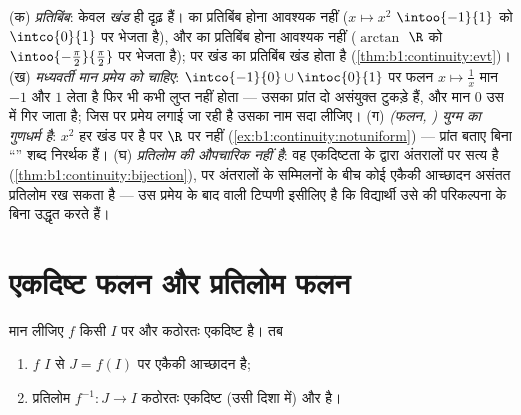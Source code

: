 \begin{remark}[तीनों प्रमेयों के इर्द-गिर्द सामान्य भूलें]
(क) \emph{ प्रतिबिंब}: केवल \emph{खंड} ही दृढ़ हैं।   का 
प्रतिबिंब  होना आवश्यक नहीं ($x \mapsto x^2$ $\intoo{-1}{1}$ को
$\intco{0}{1}$ पर भेजता है), और  का प्रतिबिंब  होना आवश्यक
नहीं ($\arctan$  $\R$ को  $\intoo{-\frac\pi2}{\frac\pi2}$ पर भेजता
है); पर खंड का प्रतिबिंब खंड होता है (\cref{thm:b1:continuity:evt})। (ख)
\emph{मध्यवर्ती मान प्रमेय को  चाहिए}: $\intco{-1}{0} \cup
\intoc{0}{1}$ पर  फलन $x \mapsto \frac1x$ मान $-1$ और $1$ लेता है फिर भी
कभी लुप्त नहीं होता --- उसका प्रांत दो असंयुक्त टुकड़े हैं, और मान $0$ उस
 में गिर जाता है; जिस  पर प्रमेय लगाई जा रही है उसका नाम सदा
लीजिए। (ग) \emph{ (फलन, ) युग्म का गुणधर्म है}: $x^2$
हर खंड पर  है पर $\R$ पर नहीं
(\cref{ex:b1:continuity:notuniform}) --- प्रांत बताए बिना ``'' शब्द निरर्थक हैं। (घ) \emph{प्रतिलोम की  औपचारिक नहीं है}: वह
एकदिष्टता के द्वारा अंतरालों पर सत्य है
(\cref{thm:b1:continuity:bijection}), पर अंतरालों के सम्मिलनों के बीच कोई
 एकैकी आच्छादन असंतत प्रतिलोम रख सकता है --- उस प्रमेय के बाद वाली
टिप्पणी इसीलिए है कि विद्यार्थी उसे  की परिकल्पना के बिना उद्धृत करते
हैं।
\end{remark}

\section{एकदिष्ट फलन और प्रतिलोम फलन}

\begin{theorem}[एकदिष्ट एकैकी आच्छादन प्रमेय]\label{thm:b1:continuity:bijection}
मान लीजिए $f$ किसी  $I$ पर  और कठोरतः एकदिष्ट है। तब
\begin{enumerate}
  \item $f$ $I$ से  $J = f(I)$ पर एकैकी आच्छादन है;
  \item प्रतिलोम $f^{-1} \colon J \to I$ कठोरतः एकदिष्ट (उसी दिशा में) और
  \emph{} है।
\end{enumerate}
\end{theorem}

